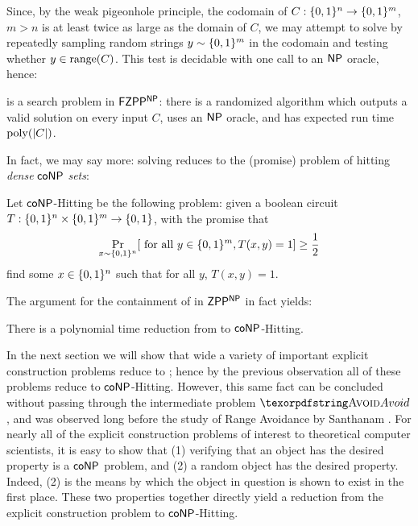 Since, by the weak pigeonhole principle, the codomain of $C: \{0,1\}^n \to \{0,1\}^m$, $m > n$ is at least twice as large as the domain of $C$, we may attempt to solve \avoid by repeatedly sampling random strings $y \sim \{0,1\}^m$ in the codomain and testing whether $y \in \mathrm{range}(C)$. This test is decidable with one call to an $\cl{NP}$ oracle, hence: 
\begin{observation}
\avoid is a search problem in $\cl{FZPP^{NP}}$: there is a randomized algorithm which outputs a valid \avoid solution on every input $C$, uses an $\cl{NP}$ oracle, and has expected run time $\mathrm{poly}(|C|)$.
\end{observation}

In fact, we may say more: solving \avoid reduces to the (promise) problem of hitting \emph{dense} $\cl{coNP}$ \emph{sets}:
\begin{definition}
Let {\sc $\cl{coNP}$-Hitting} be the following problem: given a boolean circuit $T: \{0,1\}^n \times \{0,1\}^m \to \{0,1\}$, with the promise that 
\[
\Pr_{x \sim \{0,1\}^n} [ \text{ for all } y \in \{0,1\}^m, T(x,y) = 1] \geq \frac{1}{2}
\]
find some $x \in \{0,1\}^n$ such that for all $y$, $T(x,y)= 1$.
\end{definition} 
The argument for the containment of \avoid in $\cl{ZPP^{NP}}$ in fact yields:
\begin{observation}
There is a polynomial time reduction from \avoid to {\sc $\cl{coNP}$-Hitting}.
\end{observation}

In the next section we will show that wide a variety of important explicit construction problems reduce to \avoid; hence by the previous observation all of these problems reduce to {\sc $\cl{coNP}$-Hitting}. However, this same fact can be concluded without passing through the intermediate problem $\avoid$, and was observed long before the study of Range Avoidance by Santhanam \cite{explicit-constructions}. For nearly all of the explicit construction problems of interest to theoretical computer scientists, it is easy to show that (1) verifying that an object has the desired property is a $\cl{coNP}$ problem, and (2) a random object has the desired property. Indeed, (2) is the means by which the object in question is shown to exist in the first place. These two properties together directly yield a reduction from the explicit construction problem to {\sc $\cl{coNP}$-Hitting}. 

